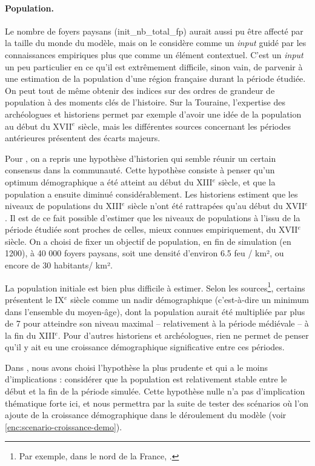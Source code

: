 \paragraph{Population.}
Le nombre de foyers paysans (\textsf{init\_nb\_total\_fp}) aurait aussi pu être affecté par la taille du monde du modèle, mais on le considère comme un \textit{input} guidé par les connaissances empiriques plus que comme un élément contextuel.
C'est un \textit{input} un peu particulier en ce qu'il est extrêmement difficile, sinon vain, de parvenir à une estimation de la population d'une région française durant la période étudiée.
On peut tout de même obtenir des indices sur des ordres de grandeur de population à des moments clés de l'histoire.
Sur la Touraine, l'expertise des archéologues et historiens
permet par exemple d'avoir une idée de la population au début du XVII$^e$ siècle, mais les différentes sources concernant les périodes antérieures présentent des écarts majeurs.

Pour \simfeodal{}, on a repris une hypothèse d'historien qui semble réunir un certain consensus dans la communauté.
Cette hypothèse consiste à penser qu'un optimum démographique a été atteint au début du XIII$^e$ siècle, et que la population a ensuite diminué considérablement.
Les historiens estiment que les niveaux de populations du XIII$^e$ siècle n'ont été rattrapées qu'au début du XVII$^e$.
Il est de ce fait possible d'estimer que les niveaux de populations à l'issu de la période étudiée sont proches de celles, mieux connues empiriquement, du XVII$^e$ siècle.
On a choisi de fixer un objectif de population, en fin de simulation (en 1200), à 40 000 foyers paysans, soit une densité d'environ 6.5 feu / km², ou encore de 30 habitants/ km².

La population initiale est bien plus difficile à estimer.
Selon les sources\footnote{
	Par exemple, dans le nord de la France, \textcite{derville_population_1998}.
}, certains présentent le IX$^e$ siècle comme un \og nadir\fg{} démographique (c'est-à-dire un minimum dans l'ensemble du moyen-âge), dont la population aurait été multipliée par plus de 7 pour atteindre son niveau maximal -- relativement à la période médiévale -- à la fin du XIII$^e$.
Pour d'autres historiens et archéologues, rien ne permet de penser qu'il y ait eu une croissance démographique significative entre ces périodes.

Dans \simfeodal{}, nous avons choisi l'hypothèse la plus prudente et qui a le moins d'implications : considérer que la population est relativement stable entre le début et la fin de la période simulée.
Cette \og hypothèse nulle\fg{} n'a pas d'implication thématique forte ici, et nous permettra par la suite de tester des scénarios où l'on ajoute de la croissance démographique dans le déroulement du modèle (voir \cref{enc:scenario-croissance-demo}).


